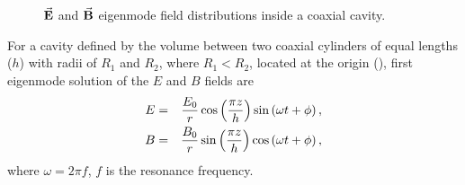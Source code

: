 \documentclass{article}
\begin{document}
\begin{figure}[H]
    \centering
    \qquad{}%
    \vspace{20pt}
    \caption{$\vec{\textbf{E}}$ and $\vec{\textbf{B}}$ eigenmode field distributions inside a coaxial cavity.}
    \label{fig:rhodo_cavity_field_dist}
\end{figure}
For a cavity defined by the volume between two coaxial cylinders of equal lengths ($h$) with radii of $R_1$ and $R_2$, where $R_1 < R_2$, located at the origin (),
first eigenmode solution of the $E$ and $B$ fields are \cite{rhodo_pottier}
\vspace{-10pt}\begin{eqnarray}
    E &=& \frac{E_0}{r} \cos\left( \frac{\pi z}{h} \right) \sin \left( \omega t + \phi \right)  , \\
    B &=& \frac{B_0}{r} \sin\left( \frac{\pi z}{h}\right) \cos\left( \omega t + \phi\right)  ,
\vspace{-10pt}\end{eqnarray}
where $\omega=2\pi f$, $f$ is the resonance frequency.
\end{document}
